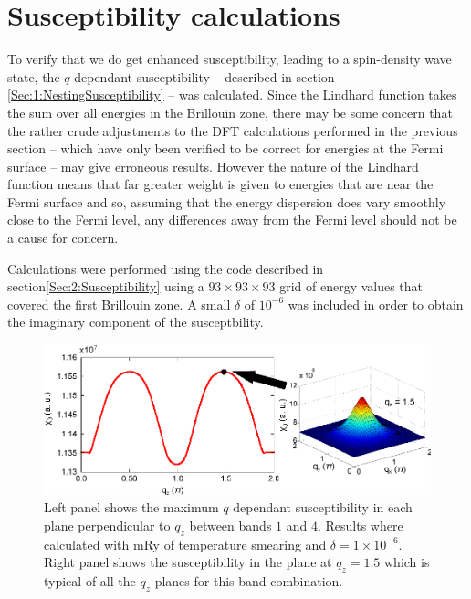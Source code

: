 
\section{Susceptibility calculations}
    \label{Sec:3:SubsceptibilityCalculation}


To verify that we do get enhanced susceptibility, leading to a spin-density wave state, the $q$-dependant susceptibility -- described in section \ref{Sec:1:NestingSusceptibility} -- was calculated. Since the Lindhard function takes the sum over all energies in the Brillouin zone, there may be some concern that the rather crude adjustments to the DFT calculations performed in the previous section -- which have only been verified to be correct for energies at the Fermi surface -- may give erroneous results. However the nature of the Lindhard function means that far greater weight is given to energies that are near the Fermi surface and so, assuming that the energy dispersion does vary smoothly close to the Fermi level, any differences away from the Fermi level should not be a cause for concern.  

Calculations were performed using the  code described in section\ref{Sec:2:Susceptibility} using a $93\times93\times93$ grid of energy values that covered the first Brillouin zone. A small $\delta$ of $10^{-6}$ was included in order to obtain the imaginary component of the susceptbility.

\begin{figure}[htbp]
    \begin{center}
        \includegraphics[scale=0.9]{Chapter3-dHvABaFe2P2/Figures/AngleDepMeasurements/SusceptibilityEnhancement/SusceptibilityEnhancement}
        \caption{Left panel shows the maximum $q$ dependant susceptibility in each plane perpendicular to $q_z$ between bands $1$ and $4$. Results where calculated with \unit[1]{mRy} of temperature smearing and $\delta=1\times10^{-6}$. Right panel shows the susceptibility in the plane at $q_z=1.5$ which is typical of all the $q_z$ planes for this band combination.}
        \label{Fig:3:SusceptbilityEnhancement}
    \end{center}
\end{figure}


